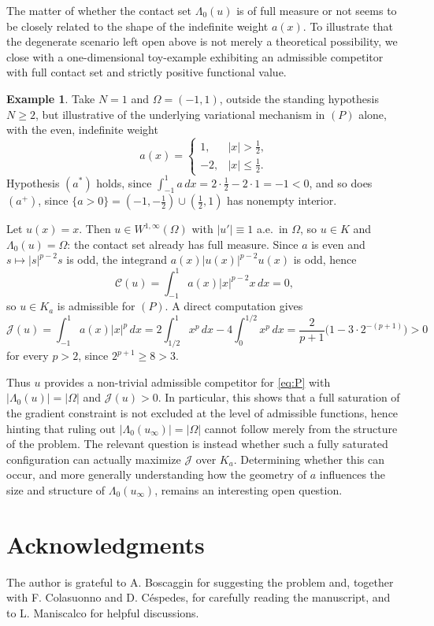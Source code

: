 \documentclass[11pt,reqno]{amsart}
\theoremstyle{plain}
\theoremstyle{definition}
\newtheorem{example}[theorem]{Example}
\numberwithin{equation}{section}
\begin{document}
The matter of whether the contact set $\Lambda_0(u)$ is of full measure or not seems to be closely related to the shape of the indefinite weight $a(x)$. To illustrate that the degenerate scenario left open above is not merely a
theoretical possibility, we close with a one-dimensional toy-example exhibiting
an admissible competitor with full contact set and strictly positive
functional value.




\begin{example} \label{ex:final}
Take $N=1$ and $\Omega=(-1,1)$, outside the standing hypothesis $N\ge 2$, but illustrative of the underlying variational mechanism
in $(P)$ alone, with the even, indefinite weight
$$
a(x)=
\begin{cases}
1, & |x|>\tfrac12,\\
-2, & |x|\leq\tfrac12.
\end{cases}
$$
Hypothesis $(a^*)$ holds, since $\int_{-1}^1 a\,dx = 2\cdot\tfrac12-2\cdot 1=-1<0$,
and so does $(a^+)$, since $\{a>0\}=(-1,-\tfrac12)\cup(\tfrac12,1)$ has
nonempty interior.

Let $u(x)=x$. Then $u\in W^{1,\infty}(\Omega)$ with $|u'|\equiv 1$ a.e.\ in
$\Omega$, so $u\in K$ and $\Lambda_0(u)=\Omega$: the contact set already has
full measure. Since $a$ is even and $s\mapsto |s|^{p-2}s$ is odd, the
integrand $a(x)|u(x)|^{p-2}u(x)$ is odd, hence
$$
\mathcal C(u)=\int_{-1}^1 a(x)|x|^{p-2}x\,dx=0,
$$
so $u\in K_a$ is admissible for $(P)$. A direct computation gives
$$
\mathcal J(u)=\int_{-1}^1 a(x)|x|^p\,dx
=2\int_{1/2}^1 x^p\,dx-4\int_0^{1/2}x^p\,dx
=\frac{2}{p+1}\Big(1-3\cdot 2^{-(p+1)}\Big)>0
$$
for every $p>2$, since $2^{p+1}\ge 8>3$.
\end{example}

Thus $u$ provides a non-trivial admissible competitor for \eqref{eq:P} with
$|\Lambda_0(u)|=|\Omega|$ and $\mathcal J(u)>0$. In particular, this shows that a full saturation of
the gradient constraint is not excluded at the level of admissible functions, hence hinting that ruling out
$|\Lambda_0(u_\infty)|=|\Omega|$ cannot follow merely from the structure of
the problem. The relevant question is instead whether such a fully saturated
configuration can actually maximize $\mathcal J$ over $K_a$. Determining whether this can occur, and more generally understanding how the
geometry of $a$ influences the size and structure of
$\Lambda_0(u_\infty)$, remains an interesting open question.
\section*{Acknowledgments}
The author is grateful to A. Boscaggin for suggesting the problem and, together with F. Colasuonno and D. Céspedes, for carefully reading the manuscript, and to L. Maniscalco for helpful discussions.
\end{document}
